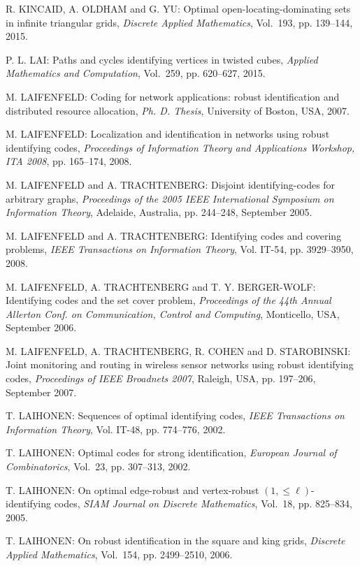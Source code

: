 \begin{thebibliography}{999}
R. KINCAID, A. OLDHAM and G. YU: Optimal open-locating-dominating sets in infinite triangular grids, {\it Discrete Applied Mathematics}, Vol.~193, pp. 139--144, 2015.

P. L. LAI: Paths and cycles identifying vertices in twisted cubes, {\it Applied Mathematics and Computation}, Vol.~259, pp. 620--627, 2015.

M. LAIFENFELD: Coding for network applications: robust identification and distributed resource allocation, {\it Ph. D. Thesis}, University of Boston, USA, 2007.

M. LAIFENFELD: Localization and identification in networks using robust identifying codes, {\it Proceedings of Information Theory and Applications Workshop, ITA 2008}, pp. 165--174, 2008.

M. LAIFENFELD and A. TRACHTENBERG: Disjoint identifying-codes for arbitrary graphs, {\it Proceedings of the 2005 IEEE International Symposium on Information Theory}, Adelaide, Australia, pp. 244--248, September 2005.

M. LAIFENFELD and A. TRACHTENBERG: Identifying codes and covering problems, {\it IEEE Transactions on Information Theory}, Vol. IT-54, pp. 3929--3950, 2008.

M. LAIFENFELD, A. TRACHTENBERG and T. Y. BERGER-WOLF: Identifying codes and the set cover problem, {\it Proceedings of the 44th Annual Allerton Conf. on Communication, Control and Computing}, Monticello, USA, September 2006.

M. LAIFENFELD, A. TRACHTENBERG, R. COHEN and D. STARO\-BINSKI: Joint monitoring and routing in wireless sensor networks using robust identifying codes, {\it Proceedings of IEEE Broadnets 2007}, Raleigh, USA, pp. 197--206, September 2007.

T. LAIHONEN: Sequences of optimal identifying codes, {\it IEEE Transactions on Information Theory}, Vol. IT-48, pp. 774--776, 2002.

T. LAIHONEN: Optimal codes for strong identification, {\it European Journal of Combinatorics}, Vol.~23, pp. 307--313, 2002.

T. LAIHONEN: On optimal edge-robust and vertex-robust $(1,\leq\ell)$-identifying codes, {\it SIAM Journal on Discrete Mathematics}, Vol.~18, pp. 825--834, 2005.

T. LAIHONEN: On robust identification in the square and king grids, {\it Discrete Applied Mathematics}, Vol.~154, pp. 2499--2510, 2006.



\end{thebibliography}

